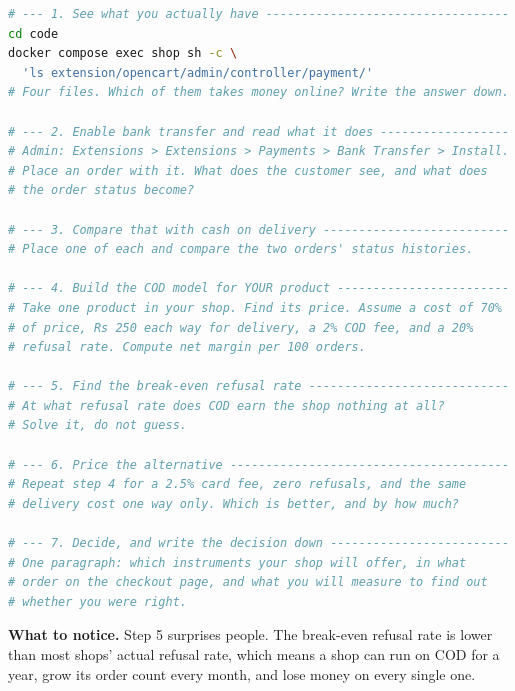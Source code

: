 \begin{lab}
\begin{lstlisting}[language=bash]
# --- 1. See what you actually have ----------------------------------
cd code
docker compose exec shop sh -c \
  'ls extension/opencart/admin/controller/payment/'
# Four files. Which of them takes money online? Write the answer down.

# --- 2. Enable bank transfer and read what it does ------------------
# Admin: Extensions > Extensions > Payments > Bank Transfer > Install.
# Place an order with it. What does the customer see, and what does
# the order status become?

# --- 3. Compare that with cash on delivery --------------------------
# Place one of each and compare the two orders' status histories.

# --- 4. Build the COD model for YOUR product ------------------------
# Take one product in your shop. Find its price. Assume a cost of 70%
# of price, Rs 250 each way for delivery, a 2% COD fee, and a 20%
# refusal rate. Compute net margin per 100 orders.

# --- 5. Find the break-even refusal rate ----------------------------
# At what refusal rate does COD earn the shop nothing at all?
# Solve it, do not guess.

# --- 6. Price the alternative ---------------------------------------
# Repeat step 4 for a 2.5% card fee, zero refusals, and the same
# delivery cost one way only. Which is better, and by how much?

# --- 7. Decide, and write the decision down -------------------------
# One paragraph: which instruments your shop will offer, in what
# order on the checkout page, and what you will measure to find out
# whether you were right.
\end{lstlisting}

\smallskip
\textbf{What to notice.} Step 5 surprises people. The break-even refusal rate
is lower than most shops' actual refusal rate, which means a shop can run on
COD for a year, grow its order count every month, and lose money on every
single one.
\end{lab}


